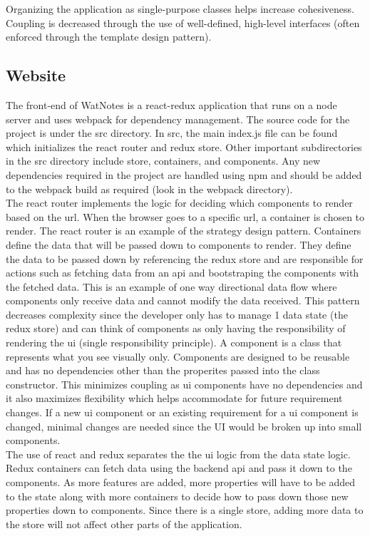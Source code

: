 \documentclass[12pt]{article}
\begin{document}
    Organizing the application as single-purpose classes helps increase cohesiveness. Coupling is decreased through the use of well-defined, high-level interfaces (often enforced
    through the template design pattern).

  \subsection{Website}
  The front-end of WatNotes is a react-redux application that runs on a node server and uses webpack for dependency management. The source code for the project is under the src directory. In src, the main index.js file can be found which initializes the react router and redux store. Other important subdirectories in the src directory include store, containers, and components. Any new dependencies required in the project are handled using npm and should be added to the webpack build as required (look in the webpack directory).\\

  The react router implements the logic for deciding which components to render based on the url. When the browser goes to a specific url, a container is chosen to render. The react router is an example of the strategy design pattern. Containers define the data that will be passed down to components to render. They define the data to be passed down by referencing the redux store and are responsible for actions such as fetching data from an api and bootstraping the components with the fetched data. This is an example of one way directional data flow where components only receive data and cannot modify the data received. This pattern decreases complexity since the developer only has to manage 1 data state (the redux store) and can think of components as only having the responsibility of rendering the ui (single responsibility principle). A component is a class that represents what you see visually only. Components are designed to be reusable and has no dependencies other than the properites passed into the class constructor. This minimizes coupling as ui components have no dependencies and it also maximizes flexibility which helps accommodate for future requirement changes. If a new ui component or an existing requirement for a ui component is changed, minimal changes are needed since the UI would be broken up into small components.\\

  The use of react and redux separates the the ui logic from the data state logic. Redux containers can fetch data using the backend api and pass it down to the components. As more features are added, more properties will have to be added to the state along with more containers to decide how to pass down those new properties down to components. Since there is a single store, adding more data to the store will not affect other parts of the application.
\end{document}
